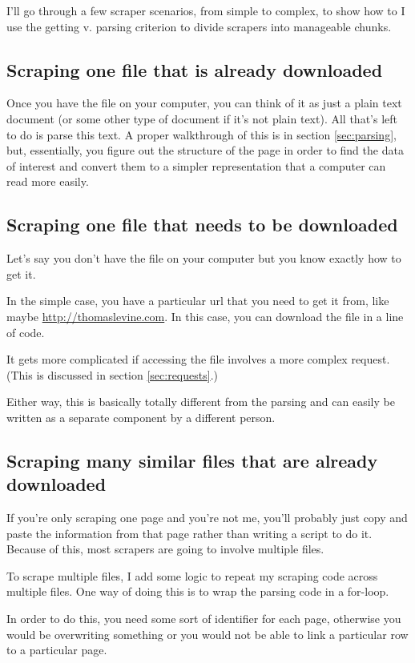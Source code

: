 \documentclass{article}
\begin{document}
I'll go through a few scraper scenarios, from simple to complex, to
show how to I use the getting v. parsing criterion to divide scrapers
into manageable chunks.

\subsection{Scraping one file that is already downloaded}
Once you have the file on your computer, you can think of it as
just a plain text document (or some other type of document if it's
not plain text). All that's left to do is parse this text.
A proper walkthrough of this is in section \ref{sec:parsing},
but, essentially, you figure out the structure of the page in order
to find the data of interest and convert them to a simpler
representation that a computer can read more easily.

\subsection{Scraping one file that needs to be downloaded}
Let's say you don't have the file on your computer but you know
exactly how to get it.

In the simple case, you have a particular url that you need
to get it from, like maybe \url{http://thomaslevine.com}.
In this case, you can download the file in a line of code.

It gets more complicated if accessing the file involves a
more complex request. (This is discussed in section
\ref{sec:requests}.)

Either way, this is basically totally different from the parsing
and can easily be written as a separate component by a different person.

\subsection{Scraping many similar files that are already downloaded}
If you're only scraping one page and you're not me, you'll probably just
copy and paste the information from that page rather than writing
a script to do it. Because of this, most scrapers are going to involve
multiple files.

To scrape multiple files, I add some logic to repeat my scraping code
across multiple files. One way of doing this is to wrap the parsing
code in a for-loop.

In order to do this, you need some sort of identifier for each page,
otherwise you would be overwriting something or you would not be able
to link a particular row to a particular page.
\end{document}
